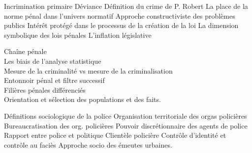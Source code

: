 \documentclass[10pt, a4paper, openany]{book}
\begin{document}
Incrimination primaire
Déviance
Définition du crime de P. Robert
La place de la norme pénal dans l'univers normatif
Approche constructiviste des problèmes publics
Intérêt protégé dans le processus de la création de la loi
La dimension symbolique des lois pénales
L'inflation législative


Chaîne pénale \\
Les biais de l'analyse statistique \\
Mesure de la criminalité vs mesure de la criminalisation \\
Entonnoir pénal et filtre successif \\
Filières pénales différenciés \\
Orientation et sélection des populations et des faits. 


Définitions sociologique de la police
Organisation territoriale des orgas policières
Bureaucratisation des org. policières
Pouvoir discrétionnaire des agents de police
Rapport entre police et politique
Clientèle policière
Contrôle d'identité et contrôle au faciès
Approche socio des émeutes urbaines. 
\end{document}
